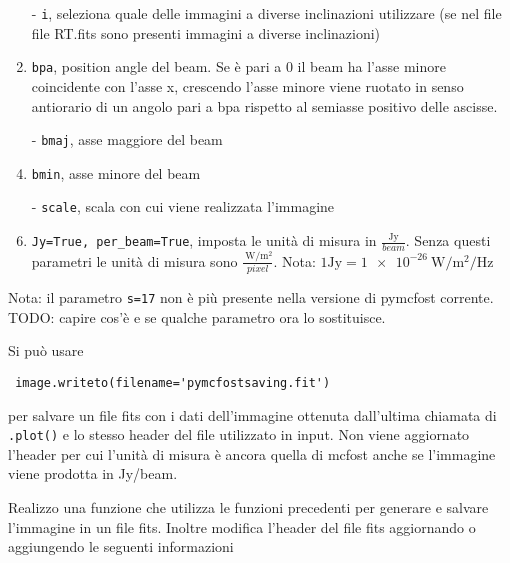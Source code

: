 \documentclass[DIN, pagenumber=false, fontsize=11pt, parskip=half]{scrartcl}
\begin{document}
\begin{enumerate}
 \item[-] \lstinline{i}, seleziona quale delle immagini a diverse inclinazioni utilizzare (se nel file file RT.fits sono presenti immagini a diverse inclinazioni)
 \item[-] \lstinline{bpa}, position angle del beam. Se è pari a 0 il beam ha l'asse minore coincidente con l'asse x, crescendo l'asse minore viene ruotato in senso antiorario di un angolo pari a bpa rispetto al semiasse positivo delle ascisse.
\item[-] \lstinline{bmaj}, asse maggiore del beam
\item[-] \lstinline{bmin}, asse minore del beam
\item[-] \lstinline{scale}, scala con cui viene realizzata l'immagine \item[-] \lstinline{Jy=True, per_beam=True}, imposta le unità di misura in $\frac {\text{Jy}}{beam}$. Senza questi parametri le unità di misura sono $\frac {\SI{}{\W\per\m\squared}}{pixel}$. Nota: $1\text{Jy} = \SI{1e-26}{\W\per\m\squared\per\Hz}$
\end{enumerate}

Nota: il parametro \lstinline{s=17} non è più presente nella versione di pymcfost corrente. TODO: capire cos'è e se qualche parametro ora lo sostituisce.

Si può usare
\begin{lstlisting}
 image.writeto(filename='pymcfostsaving.fit')
\end{lstlisting}
per salvare un file fits con i dati dell'immagine ottenuta dall'ultima chiamata di \lstinline{.plot()} e lo stesso header del file utilizzato in input. Non viene aggiornato l'header per cui l'unità di misura è ancora quella di mcfost anche se l'immagine viene prodotta in Jy/beam.       

Realizzo una funzione che utilizza le funzioni precedenti per generare e salvare l'immagine in un file fits. Inoltre modifica l'header del file fits aggiornando o aggiungendo le seguenti informazioni
\end{document}
